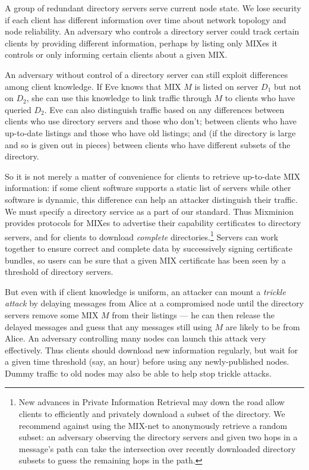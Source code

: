 \documentclass{llncs}
\begin{document}
A group of redundant directory servers serve current node state. We lose
security if each client has different information over time about network
topology and node reliability. An adversary who controls a directory
server could track certain clients by providing different information,
perhaps by listing only MIXes it controls or only informing certain
clients about a given MIX.

An adversary without control of a directory server can still exploit
differences among client knowledge. If Eve knows that MIX $M$ is listed
on server $D_1$ but not on $D_2$, she can use this knowledge to link
traffic through $M$ to clients who have queried $D_2$.  Eve can also
distinguish traffic based on any differences between clients who use
directory servers and those who don't; between clients who have up-to-date
listings and those who have old listings; and (if the directory is large
and so is given out in pieces) between clients who have different subsets
of the directory.

So it is not merely a matter of convenience for clients to retrieve
up-to-date MIX information: if some client software supports a static
list of servers while other software is dynamic, this difference can
help an attacker distinguish their traffic. We must specify a directory
service as a part of our standard. Thus Mixminion provides protocols for
MIXes to advertise their capability certificates to directory servers,
and for clients to download \emph{complete} directories.\footnote{
  New advances in Private Information Retrieval \cite{malkin-thesis} may down the
  road allow clients to efficiently and privately download a subset of
  the directory. We recommend against using the MIX-net to anonymously
  retrieve a random subset: an adversary observing the directory servers
  and given two hops in a message's path can take the intersection over
  recently downloaded directory subsets to guess the remaining hops in
  the path.}
Servers can work together to ensure correct and complete data by
successively signing certificate bundles, so users can be sure that a
given MIX certificate has been seen by a threshold of directory servers.

But even with if client knowledge is uniform, an attacker can mount a
\emph{trickle attack} by delaying messages from Alice at a compromised
node until the directory servers remove some MIX $M$ from their listings
--- he can then release the delayed messages and guess that any messages
still using $M$ are likely to be from Alice. An adversary controlling
many nodes can launch this attack very effectively. Thus clients
should download new information regularly,
but wait for a given time threshold (say, an hour) before using any
newly-published nodes. Dummy traffic to old nodes may also be able to
help stop trickle attacks.
\end{document}
